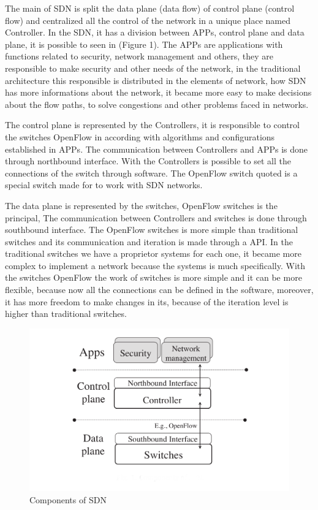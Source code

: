 \documentclass[12pt]{article}
\begin{document}
The main of SDN is split the data plane (data flow) of control plane (control flow) and centralized all the control of the network in a unique place named Controller. In the SDN, it has a division between APPs, control plane and data plane, it is possible to seen in (Figure 1). The APPs are applications with functions related to security, network management and others, they are responsible to make security and other needs of the network, in the traditional architecture this responsible is distributed in the elements of network, how SDN has more informations about the network, it became more easy to make decisions about the flow paths, to solve congestions and other problems faced in networks.

The control plane is represented by the Controllers, it is responsible to control the switches OpenFlow in according with algorithms and configurations established in APPs. The communication between Controllers and APPs is done through northbound interface. With the Controllers is possible to set all the connections of the switch through software. The OpenFlow switch quoted is a special switch made for to work with SDN networks.

The data plane is represented by the switches, OpenFlow switches is the principal, The communication between Controllers and switches is done through southbound interface. The OpenFlow switches is more simple than traditional switches and its communication and iteration is made through a API. In the traditional switches we have a proprietor systems for each one, it became more complex to implement a network because the systems is much specifically. With the switches OpenFlow the work of switches is more simple and it can be more flexible, because now all the connections can be defined in the software, moreover, it has more freedom to make changes in its, because of the iteration level is higher than traditional switches.

\begin{figure}[ht]
\centering
\includegraphics[width=.7\textwidth]{figure1.png}
\caption{Components of SDN}
\label{figure1}
\end{figure}
\end{document}

